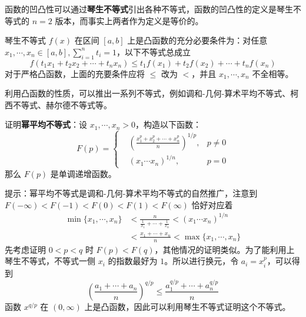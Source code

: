 函数的凹凸性可以通过\textbf{琴生不等式}引出各种不等式，函数的凹凸性的定义是琴生不等式的 $n=2$ 版本，而事实上两者作为定义是等价的。
\begin{theorem}{琴生不等式}
$f(x)$ 在区间 $[a,b]$ 上是凸函数的充分必要条件为：对任意 $x_1,\cdots,x_n\in [a,b],\sum_{i=1}^n t_i=1$，以下不等式总成立
\begin{equation}
f(t_1x_1+t_2x_2+\cdots+t_nx_n)\le t_1f(x_1)+t_2f(x_2)+\cdots+t_nf(x_n)
\end{equation}
对于严格凸函数，上面的充要条件应将 $\le$ 改为 $<$，并且 $x_1,\cdots,x_n$ 不全相等。
\end{theorem}
利用凸函数的性质，可以推出一系列不等式，例如调和-几何-算术平均不等式、柯西不等式、赫尔德不等式等。
\begin{exercise}{}
证明\textbf{幂平均不等式}：设 $x_1,\cdots,x_n>0$，构造以下函数：
\begin{equation}
F(p)=\left\{
\begin{aligned}
&\left(\frac{x_1^p+x_2^p+\cdots+x_n^p}{n}\right)^{1/p}, &p\neq 0\\
&(x_1\cdots x_n)^{1/n}, &p=0
\end{aligned}
\right.
\end{equation}
那么 $F(p)$ 是单调递增函数。
\end{exercise}
提示：幂平均不等式是调和-几何-算术平均不等式的自然推广，注意到 $F(-\infty)<F(-1)<F(0)<F(1)<F(\infty)$ 恰好对应着
\begin{equation}
\begin{aligned}
\min\{x_1,\cdots,x_n\}&<\frac{n}{\frac{1}{x_1}+\cdots+\frac{1}{x_n}}<(x_1\cdots x_n)^{1/n}\\
&<\frac{x_1+\cdots+x_n}{n}<\max\{x_1,\cdots,x_n\}
\end{aligned}
\end{equation}
先考虑证明 $0<p<q$ 时 $F(p)<F(q)$，其他情况的证明类似。为了能利用上琴生不等式，不等式一侧 $x_i$ 的指数最好为 $1$。所以进行换元，令 $a_i=x_i^p$，可以得到
\begin{equation}
\left(\frac{a_1+\cdots+a_n}{n}\right)^{q/p}\le \frac{a_1^{q/p}+\cdots+a_n^{q/p}}{n}
\end{equation}
函数 $x^{q/p}$ 在 $(0,\infty)$ 上是凸函数，因此可以利用琴生不等式证明这个不等式。

